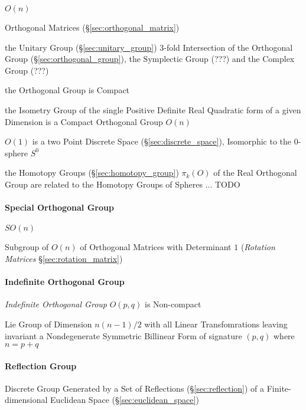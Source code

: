 \begin{itemize}
$O(n)$

Orthogonal Matrices (\S\ref{sec:orthogonal_matrix})

the Unitary Group (\S\ref{sec:unitary_group}) 3-fold Intersection of the
Orthogonal Group (\S\ref{sec:orthogonal_group}), the Symplectic Group (???) and
the Complex Group (???) %

the Orthogonal Group is Compact

the Isometry Group of the single Positive Definite Real Quadratic form of a
given Dimension is a Compact Orthogonal Group $O(n)$

$O(1)$ is a two Point Discrete Space (\S\ref{sec:discrete_space}), Isomorphic
to the $0$-sphere $S^0$

the Homotopy Groups (\S\ref{sec:homotopy_group}) $\pi_k(O)$ of the Real
Orthogonal Group are related to the Homotopy Groups of Spheres
... TODO



\paragraph{Special Orthogonal Group}\label{sec:special_orthogonal_group}\hfill

$SO(n)$

Subgroup of $O(n)$ of Orthogonal Matrices with Determinant $1$ (\emph{Rotation
  Matrices} \S\ref{sec:rotation_matrix})



\paragraph{Indefinite Orthogonal Group}
\label{sec:indefinite_orthogonal_group}\hfill

\emph{Indefinite Orthogonal Group} $O(p,q)$ is Non-compact

Lie Group of Dimension $n(n-1)/2$ with all Linear Transfomrations leaving
invariant a Nondegenerate Symmetric Billinear Form of signature $(p,q)$ where
$n = p+q$



\paragraph{Reflection Group}\label{sec:reflection_group}\hfill

Discrete Group Generated by a Set of Reflections (\S\ref{sec:reflection}) of a
Finite-dimensional Euclidean Space (\S\ref{sec:euclidean_space})




\end{itemize}
